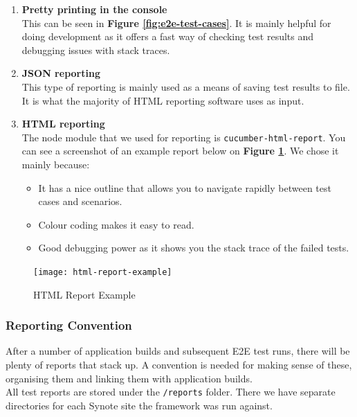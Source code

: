 \begin{enumerate}

\item \textbf{Pretty printing in the console}
\\
This can be seen in \textbf{Figure \ref{fig:e2e-test-cases}}. It is mainly helpful for doing development as it offers a fast way of checking test results and debugging issues with stack traces.

\item \textbf{JSON reporting}
\\
This type of reporting is mainly used as a means of saving test results to file. It is what the majority of HTML reporting software uses as input.

\item \textbf{HTML reporting}
\\
The node module that we used for reporting is \texttt{cucumber-html-report}. You can see a screenshot of an example report below on \textbf{Figure \ref{fig:html-report-example}}. We chose it mainly because:

\begin{itemize}
\item It has a nice outline that allows you to navigate rapidly between test cases and scenarios.
\item Colour coding makes it easy to read.
\item Good debugging power as it shows you the stack trace of the failed tests.
\end{itemize}

\end{enumerate}

\begin{figure}[!hbt]
  	\centering
 	\texttt{[image: html-report-example]}
  	\caption{HTML Report Example}
 	\label{fig:html-report-example}
\end{figure}

\subsubsection{Reporting Convention}
\label{subsubsec:reporting-convention}

After a number of application builds and subsequent E2E test runs, there will be plenty of reports that stack up. A convention is needed for making sense of these, organising them and linking them with application builds.
\\

All test reports are stored under the \texttt{/reports} folder. There we have separate directories for each Synote site the framework was run against.
\\

